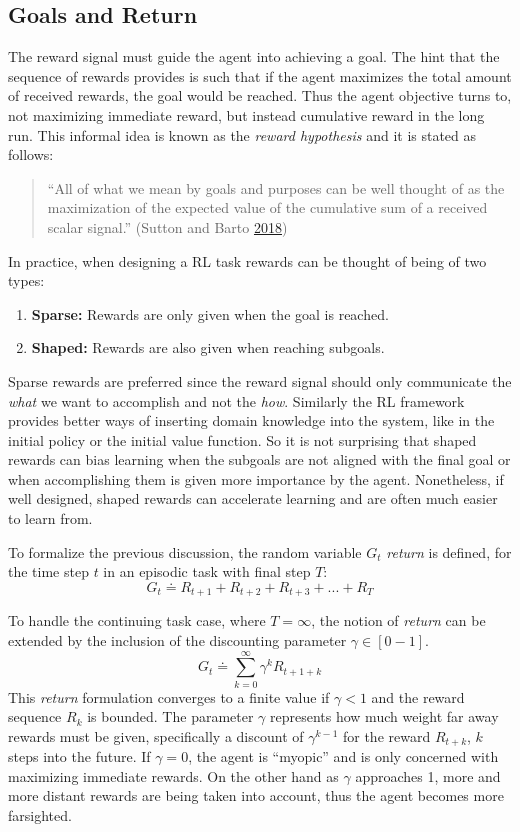 \documentclass[
  12pt,
  openany]{book}
\providecommand{\tightlist}{%
  \setlength{\itemsep}{0pt}\setlength{\parskip}{0pt}}
\begin{document}
\hypertarget{goals-and-return}{%
\subsection{Goals and Return}\label{goals-and-return}}

The reward signal must guide the agent into achieving a goal. The hint that the sequence of rewards provides is such that if the agent maximizes the total amount of received rewards, the goal would be reached. Thus the agent objective turns to, not maximizing immediate reward, but instead cumulative reward in the long run. This informal idea is known as the \emph{reward hypothesis} and it is stated as follows:

\begin{quote}
``All of what we mean by goals and purposes can be well thought of as the maximization of the expected value of the cumulative sum of a received scalar signal.'' (Sutton and Barto \protect\hyperlink{ref-sutton2018reinforcement}{2018})
\end{quote}

In practice, when designing a RL task rewards can be thought of being of two types:

\begin{enumerate}
\def\labelenumi{\arabic{enumi}.}
\tightlist
\item
  \textbf{Sparse:} Rewards are only given when the goal is reached.
\item
  \textbf{Shaped:} Rewards are also given when reaching subgoals.
\end{enumerate}

Sparse rewards are preferred since the reward signal should only communicate the \emph{what} we want to accomplish and not the \emph{how}. Similarly the RL framework provides better ways of inserting domain knowledge into the system, like in the initial policy or the initial value function. So it is not surprising that shaped rewards can bias learning when the subgoals are not aligned with the final goal or when accomplishing them is given more importance by the agent. Nonetheless, if well designed, shaped rewards can accelerate learning and are often much easier to learn from.

To formalize the previous discussion, the random variable \(G_t\) \emph{return} is defined, for the time step \(t\) in an episodic task with final step \(T\):
\[ G_t \doteq R_{t+1} + R_{t+2} + R_{t+3} + ... + R_{T}\]

To handle the continuing task case, where \(T=\infty\), the notion of \emph{return} can be extended by the inclusion of the discounting parameter \(\gamma \in [0-1]\).
\[G_t \doteq \sum_{k=0}^{\infty} \gamma^k R_{t+1+k}\]
This \emph{return} formulation converges to a finite value if \(\gamma < 1\) and the reward sequence \(R_k\) is bounded. The parameter \(\gamma\) represents how much weight far away rewards must be given, specifically a discount of \(\gamma^{k-1}\) for the reward \(R_{t+k}\), \(k\) steps into the future. If \(\gamma = 0\), the agent is ``myopic'' and is only concerned with maximizing immediate rewards. On the other hand as \(\gamma\) approaches 1, more and more distant rewards are being taken into account, thus the agent becomes more farsighted.
\end{document}

